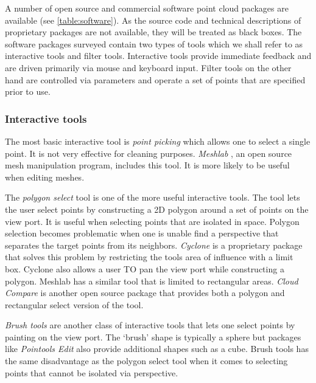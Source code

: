 
A number of open source and commercial software point cloud packages are available (see \ref{table:software}). As the source code and technical descriptions of proprietary packages are not available, they will be treated as black boxes. The software packages surveyed contain two types of tools which we shall refer to as interactive tools and filter tools. Interactive tools provide immediate feedback and are driven primarily via mouse and keyboard input. Filter tools on the other hand are controlled via parameters and operate a set of points that are specified prior to use.

\subsubsection{Interactive tools}\label{sec:interactive-tools}

The most basic interactive tool is \emph{point picking} which allows one to select a single point. It is not very effective for cleaning purposes. \emph{Meshlab} \cite{Cignoni2008}, an open source mesh manipulation program, includes this tool. It is more likely to be useful when editing meshes.

The \emph{polygon select} tool is one of the more useful interactive tools. The tool lets the user select points by constructing a 2D polygon around a set of points on the view port. It is useful when selecting points that are isolated in space. Polygon selection becomes problematic when one is unable find a perspective that separates the target points from its neighbors. \emph{Cyclone} is a proprietary package \cite{Leica2012} that solves this problem by restricting the tools area of influence with a limit box. Cyclone also allows a user TO pan the view port while constructing a polygon. Meshlab has a similar tool that is limited to rectangular areas. \emph{Cloud Compare} \cite{CloudCompare} is another open source package that provides both a polygon and rectangular select version of the tool.

\emph{Brush tools} are another class of interactive tools that lets one select points by painting on the view port. The `brush' shape is typically a sphere but packages like \emph{Pointools Edit} \cite{Pointools2012} also provide additional shapes such as a cube. Brush tools has the same disadvantage as the polygon select tool when it comes to selecting points that cannot be isolated via perspective.

